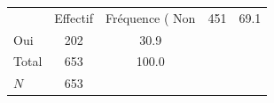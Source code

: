 {
\def\sym#1{\ifmmode^{#1}\else\(^{#1}\)\fi}
\begin{tabular}{l*{1}{cc}}
\toprule
            &    Effectif&Fréquence (%
\midrule
Non         &         451&        69.1\\
Oui         &         202&        30.9\\
Total       &         653&       100.0\\
\midrule
\(N\)       &         653&            \\
\bottomrule
\end{tabular}
}
